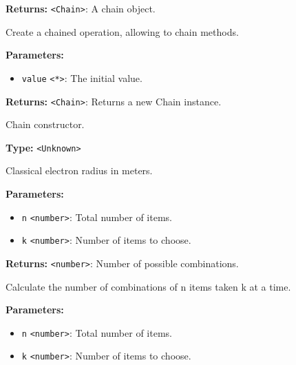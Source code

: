 \documentclass[12pt,a4paper]{article}
\begin{document}
\noindent \textbf{Returns:} \texttt{<Chain>}: A chain object.

\noindent Create a chained operation, allowing to chain methods.

\vspace{5mm}
\noindent {}


\noindent \textbf{Parameters:}
\begin{itemize}
  \item \texttt{value} \texttt{<*>}: The initial value.
\end{itemize}

\noindent \textbf{Returns:} \texttt{<Chain>}: Returns a new Chain instance.

\noindent Chain constructor.

\vspace{5mm}
\noindent {}\vspace{4mm}


\noindent \textbf{Type:} \texttt{<Unknown>}

\noindent Classical electron radius in meters.

\vspace{5mm}
\noindent {}


\noindent \textbf{Parameters:}
\begin{itemize}
  \item \texttt{n} \texttt{<number>}: Total number of items.
  \item \texttt{k} \texttt{<number>}: Number of items to choose.
\end{itemize}

\noindent \textbf{Returns:} \texttt{<number>}: Number of possible combinations.

\noindent Calculate the number of combinations of n items taken k at a time.

\vspace{5mm}
\noindent {}


\noindent \textbf{Parameters:}
\begin{itemize}
  \item \texttt{n} \texttt{<number>}: Total number of items.
  \item \texttt{k} \texttt{<number>}: Number of items to choose.
\end{itemize}
\end{document}
